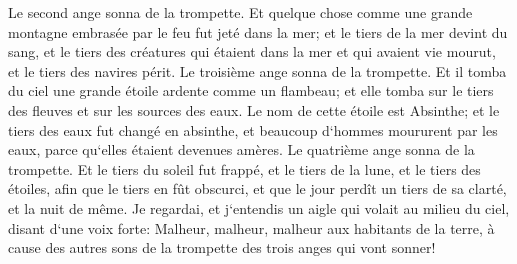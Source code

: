 \verse Le second ange sonna de la trompette. Et quelque chose comme une grande montagne embrasée par le feu fut jeté dans la mer; et le tiers de la mer devint du sang, 
\verse et le tiers des créatures qui étaient dans la mer et qui avaient vie mourut, et le tiers des navires périt. 
\verse Le troisième ange sonna de la trompette. Et il tomba du ciel une grande étoile ardente comme un flambeau; et elle tomba sur le tiers des fleuves et sur les sources des eaux. 
\verse Le nom de cette étoile est Absinthe; et le tiers des eaux fut changé en absinthe, et beaucoup d`hommes moururent par les eaux, parce qu`elles étaient devenues amères. 
\verse Le quatrième ange sonna de la trompette. Et le tiers du soleil fut frappé, et le tiers de la lune, et le tiers des étoiles, afin que le tiers en fût obscurci, et que le jour perdît un tiers de sa clarté, et la nuit de même. 
\verse Je regardai, et j`entendis un aigle qui volait au milieu du ciel, disant d`une voix forte: Malheur, malheur, malheur aux habitants de la terre, à cause des autres sons de la trompette des trois anges qui vont sonner! 

\chapter{}

